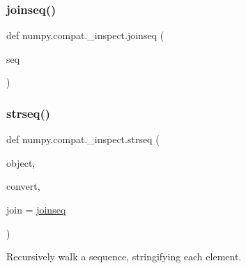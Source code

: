\subsubsection{\texorpdfstring{joinseq()}{joinseq()}}
{\footnotesize\ttfamily def numpy.\+compat.\+\_\+inspect.\+joinseq (\begin{DoxyParamCaption}\item[{}]{seq }\end{DoxyParamCaption})}

\mbox{\label{namespacenumpy_1_1compat_1_1__inspect_a7313bf47b85e2438ff6882685a66ae5f}} 
\subsubsection{\texorpdfstring{strseq()}{strseq()}}
{\footnotesize\ttfamily def numpy.\+compat.\+\_\+inspect.\+strseq (\begin{DoxyParamCaption}\item[{}]{object,  }\item[{}]{convert,  }\item[{}]{join = {\ttfamily \hyperlink{namespacenumpy_1_1compat_1_1__inspect_ab1438af7fbbffb0fd2b5a564cdd7eef8}{joinseq}} }\end{DoxyParamCaption})}

\begin{DoxyVerb}Recursively walk a sequence, stringifying each element.\end{DoxyVerb}
 